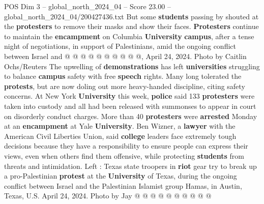 \begin{textsample}{POS Dim 3 – global\_north\_2024\_04 – Score 23.00 – global\_north\_2024\_04/200427436.txt}
But some \textbf{students} passing by shouted at the \textbf{protesters} to remove their masks and show their faces. \textbf{Protesters} continue to maintain the \textbf{encampment} on Columbia \textbf{University} \textbf{campus}, after a tense night of negotiations, in support of Palestinians, amid the ongoing conflict between Israel and @ @ @ @ @ @ @ @ @ @, April 24, 2024.
Photo by Caitlin Ochs/Reuters The upwelling of \textbf{demonstrations} has left \textbf{universities} struggling to balance \textbf{campus} safety with free \textbf{speech} rights.
Many long tolerated the \textbf{protests}, but are now doling out more heavy-handed discipline, citing safety concerns.
At New York \textbf{University} this week, \textbf{police} said 133 \textbf{protesters} were taken into custody and all had been released with summonses to appear in court on disorderly conduct charges.
More than 40 \textbf{protesters} were \textbf{arrested} Monday at an \textbf{encampment} at Yale \textbf{University}.
Ben Wizner, a \textbf{lawyer} with the American Civil Liberties Union, said \textbf{college} leaders face extremely tough decisions because they have a responsibility to ensure people can express their views, even when others find them offensive, while protecting \textbf{students} from threats and intimidation.
Left : Texas state troopers in \textbf{riot} gear try to break up a pro-Palestinian \textbf{protest} at the \textbf{University} of Texas, during the ongoing conflict between Israel and the Palestinian Islamist group Hamas, in Austin, Texas, U.S.
April 24, 2024.
Photo by Jay @ @ @ @ @ @ @ @ @ @

\end{textsample}
